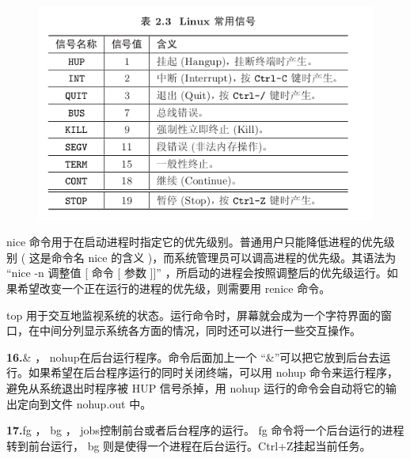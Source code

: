 \documentclass[12pt，a4paper]{article}
\numberwithin{equation}{section}
\begin{document}
\begin{figure}[H]
\centering
\includegraphics[scale=0.6]{./figures/269.png}
\end{figure}
nice 命令用于在启动进程时指定它的优先级别。普通用户只能降低进程的优先级别 ( 这是命令名 nice 的含义 )，而系统管理员可以调高进程的优先级。其语法为 “nice -n 调整值 [ 命令 [ 参数 ]]” ，所启动的进程会按照调整后的优先级运行。如果希望改变一个正在运行的进程的优先级，则需要用 renice 命令。

top 用于交互地监视系统的状态。运行命令时，屏幕就会成为一个字符界面的窗口，在中间分列显示系统各方面的情况，同时还可以进行一些交互操作。

\textbf{16.}\& ， nohup在后台运行程序。命令后面加上一个 “\&”可以把它放到后台去运行。如果希望在后台程序运行的同时关闭终端，可以用 nohup 命令来运行程序，避免从系统退出时程序被 HUP 信号杀掉，用 nohup 运行的命令会自动将它的输出定向到文件 nohup.out 中。

\textbf{17.}fg ， bg ， jobs控制前台或者后台程序的运行。 fg 命令将一个后台运行的进程转到前台运行， bg 则是使得一个进程在后台运行。Ctrl+Z挂起当前任务。
\end{document}
